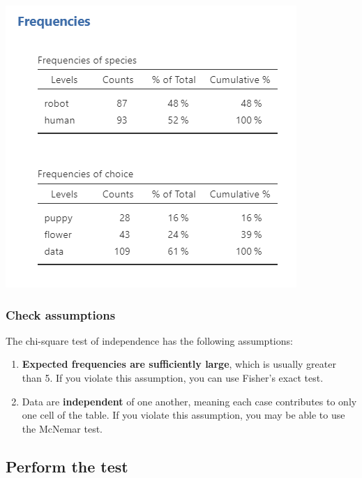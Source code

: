 \documentclass[
]{book}
\begin{document}
\includegraphics{images/11-independence/independence_data.png}

\hypertarget{check-assumptions-4}{%
\subsubsection{Check assumptions}\label{check-assumptions-4}}

The chi-square test of independence has the following assumptions:

\begin{enumerate}
\def\labelenumi{\arabic{enumi}.}
\item
  \textbf{Expected frequencies are sufficiently large}, which is usually greater than 5. If you violate this assumption, you can use Fisher's exact test.
\item
  Data are \textbf{independent} of one another, meaning each case contributes to only one cell of the table. If you violate this assumption, you may be able to use the McNemar test.
\end{enumerate}

\hypertarget{perform-the-test-4}{%
\subsection{Perform the test}\label{perform-the-test-4}}
\end{document}
